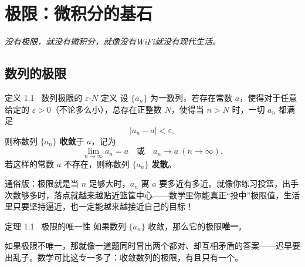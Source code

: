 \documentclass[12pt,a4paper]{article}
\newcommand{\redtext}[1]{{\color{MainRed}\textbf{#1}}}
\newcommand{\humor}[1]{\par\smallskip\begin{humorbox}#1\end{humorbox}\smallskip}
\begin{document}
\newpage
{}
\setcounter{page}{1}
\section{极限：微积分的基石}
\begin{center}\textcolor{Sunshine}{\itshape 没有极限，就没有微积分，就像没有WiFi就没有现代生活。}\end{center}

\subsection{数列的极限}

\begin{defbox}{定义 1.1 \ 数列极限的 $\varepsilon$-$N$ 定义}
设 $\{a_n\}$ 为一数列，若存在常数 $a$，使得对于任意给定的 $\varepsilon > 0$（不论多么小），总存在正整数 $N$，使得当 $n > N$ 时，一切 $a_n$ 都满足
\[
|a_n - a| < \varepsilon,
\]
则称数列 $\{a_n\}$ \textbf{收敛}于 $a$，记为
\[
\lim_{n \to \infty} a_n = a \quad \text{或} \quad a_n \to a \ (n \to \infty).
\]
若这样的常数 $a$ 不存在，则称数列 $\{a_n\}$ \textbf{发散}。
\end{defbox}
\humor{通俗版：极限就是当 $n$ 足够大时，$a_n$ 离 $a$ 要多近有多近。就像你练习投篮，出手次数够多时，落点就越来越贴近篮筐中心——数学里你能真正“投中”极限值，生活里只要坚持逼近，也一定能越来越接近自己的目标！}

\begin{center}
\end{center}

\begin{thmbox}{定理 1.1 \ 极限的唯一性}
如果数列 $\{a_n\}$ 收敛，那么它的极限\redtext{唯一}。
\end{thmbox}
\humor{如果极限不唯一，那就像一道题同时冒出两个都对、却互相矛盾的答案——迟早要出乱子。数学可比这专一多了：收敛数列的极限，有且只有一个。}
\end{document}
